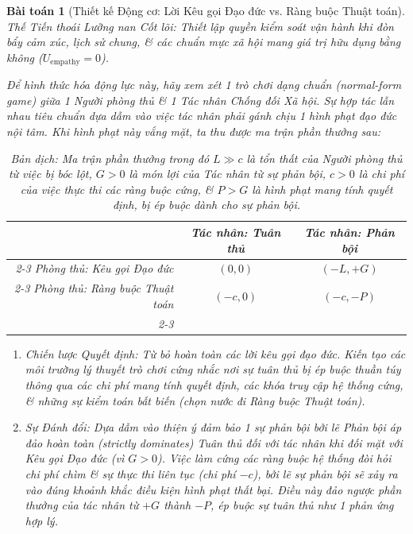 \documentclass{article}
\newtheorem{baitoan}{Bài toán}
\begin{document}
\begin{baitoan}[Thiết kế Động cơ: Lời Kêu gọi Đạo đức vs. Ràng buộc Thuật toán]
	\emph{Thế Tiến thoái Lưỡng nan Cốt lõi:} Thiết lập quyền kiểm soát vận hành khi đòn bẩy cảm xúc, lịch sử chung, \& các chuẩn mực xã hội mang giá trị hữu dụng bằng không ($U_{\text{empathy}} = 0$).
	
	Để hình thức hóa động lực này, hãy xem xét 1 trò chơi dạng chuẩn (normal-form game) giữa 1 Người phòng thủ \& 1 Tác nhân Chống đối Xã hội. Sự hợp tác lẫn nhau tiêu chuẩn \cite{axelrod1984evolution} dựa dẫm vào việc tác nhân phải gánh chịu 1 hình phạt đạo đức nội tâm. Khi hình phạt này vắng mặt, ta thu được ma trận phần thưởng sau:
	
	\begin{table}[H]
		\centering
		\renewcommand{\arraystretch}{1.5}
		\begin{tabular}{r|c|c|}
			\multicolumn{1}{c}{} & \multicolumn{1}{c}{\emph{Tác nhân: Tuân thủ}} & \multicolumn{1}{c}{\emph{Tác nhân: Phản bội}} \\ \cline{2-3}
			\emph{Phòng thủ: Kêu gọi Đạo đức} & $(0, 0)$ & $(-L, +G)$ \\ \cline{2-3}
			\emph{Phòng thủ: Ràng buộc Thuật toán} & $(-c, 0)$ & $(-c, -P)$ \\ \cline{2-3}
		\end{tabular}
		\caption{Bản dịch: Ma trận phần thưởng trong đó $L \gg c$ là tổn thất của Người phòng thủ từ việc bị bóc lột, $G > 0$ là món lợi của Tác nhân từ sự phản bội, $c > 0$ là chi phí của việc thực thi các ràng buộc cứng, \& $P > G$ là hình phạt mang tính quyết định, bị ép buộc dành cho sự phản bội.}
	\end{table}
	
	\begin{enumerate}[label=(\roman*)]
		\item \emph{Chiến lược Quyết định:} Từ bỏ hoàn toàn các lời kêu gọi đạo đức. Kiến tạo các môi trường lý thuyết trò chơi cứng nhắc nơi sự tuân thủ bị ép buộc thuần túy thông qua các chi phí mang tính quyết định, các khóa truy cập hệ thống cứng, \& những sự kiểm toán bất biến (chọn nước đi \emph{Ràng buộc Thuật toán}).
		\item \emph{Sự Đánh đổi:} Dựa dẫm vào thiện ý đảm bảo 1 sự phản bội bởi lẽ \emph{Phản bội} áp đảo hoàn toàn (strictly dominates) \emph{Tuân thủ} đối với tác nhân khi đối mặt với \emph{Kêu gọi Đạo đức} (vì $G > 0$). Việc làm cứng các ràng buộc hệ thống đòi hỏi chi phí chìm \& sự thực thi liên tục (chi phí $-c$), bởi lẽ sự phản bội sẽ xảy ra vào đúng khoảnh khắc điều kiện hình phạt thất bại. Điều này đảo ngược phần thưởng của tác nhân từ $+G$ thành $-P$, ép buộc sự tuân thủ như 1 phản ứng hợp lý.
	\end{enumerate}
\end{baitoan}
\end{document}

